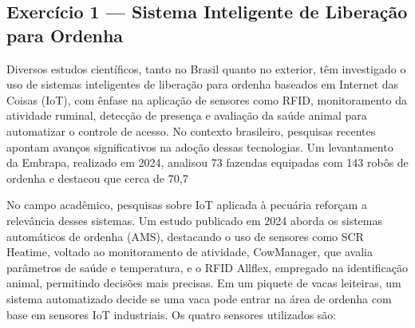 \documentclass[12pt]{article}
\begin{document}
\vspace*{0.2cm}

\subsection*{Exercício 1 — Sistema Inteligente de Liberação para Ordenha}

Diversos estudos científicos, tanto no Brasil quanto no exterior, têm investigado o uso de sistemas inteligentes de liberação para ordenha baseados em Internet das Coisas (IoT), com ênfase na aplicação de sensores como RFID, monitoramento da atividade ruminal, detecção de presença e avaliação da saúde animal para automatizar o controle de acesso. No contexto brasileiro, pesquisas recentes apontam avanços significativos na adoção dessas tecnologias. Um levantamento da Embrapa, realizado em 2024, analisou 73 fazendas equipadas com 143 robôs de ordenha e destacou que cerca de 70,7%

No campo acadêmico, pesquisas sobre IoT aplicada à pecuária reforçam a relevância desses sistemas. Um estudo publicado em 2024 aborda os sistemas automáticos de ordenha (AMS), destacando o uso de sensores como SCR Heatime, voltado ao monitoramento de atividade, CowManager, que avalia parâmetros de saúde e temperatura, e o RFID Allflex, empregado na identificação animal, permitindo decisões mais precisas.
Em um piquete de vacas leiteiras, um sistema automatizado decide se uma vaca
pode entrar na área de ordenha com base em sensores IoT industriais.
Os quatro sensores utilizados são:
\end{document}
